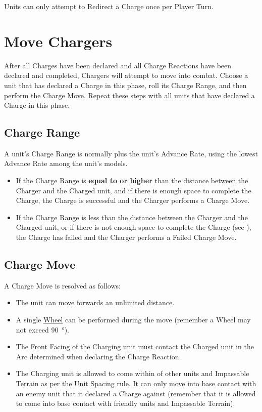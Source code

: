 Units can only attempt to Redirect a Charge once per Player Turn.

\section{Move Chargers}
\label{move_chargers}

After all Charges have been declared and all Charge Reactions have been declared and completed, Chargers will attempt to move into combat. Choose a unit that has declared a Charge in this phase,  roll its Charge Range, and then perform the Charge Move. Repeat these steps with all units that have declared a Charge in this phase.

\subsection{Charge Range}

A unit's Charge Range is normally  plus the unit's Advance Rate, using the lowest Advance Rate among the unit's models.

\begin{itemize}
\item If the Charge Range is \textbf{equal to or higher} than the distance between the Charger and the Charged unit, and if there is enough space to complete the Charge, the Charge is successful and the Charger performs a Charge Move.
\item If the Charge Range is less than the distance between the Charger and the Charged unit, or if there is not enough space to complete the Charge (see ), the Charge has failed and the Charger performs a Failed Charge Move.
\end{itemize}

\subsection{Charge Move}
\label{charge_move}

A Charge Move is resolved as follows:
\begin{itemize}
\item The unit can move forwards an unlimited distance.
\item A single \hyperref[pivots_and_wheels]{Wheel} can be performed during the move (remember a Wheel may not exceed \SI{90}{\degree}).
\item The Front Facing of the Charging unit must contact the Charged unit in the Arc determined when declaring the Charge Reaction.
\item The Charging unit is allowed to come within  of other units and Impassable Terrain as per the Unit Spacing rule. It can only move into base contact with an enemy unit that it declared a Charge against (remember that it is allowed to come into base contact with friendly units and Impassable Terrain).
\end{itemize}

